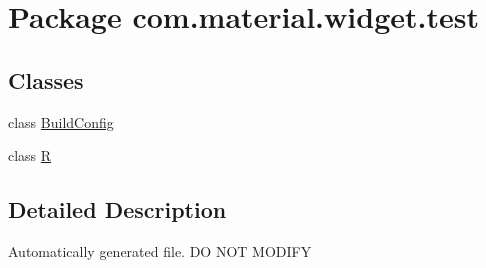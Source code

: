 \hypertarget{namespacecom_1_1material_1_1widget_1_1test}{}\section{Package com.\+material.\+widget.\+test}
\label{namespacecom_1_1material_1_1widget_1_1test}
\subsection*{Classes}
\begin{DoxyCompactItemize}
\item 
class \hyperlink{classcom_1_1material_1_1widget_1_1test_1_1_build_config}{Build\+Config}
\item 
class \hyperlink{classcom_1_1material_1_1widget_1_1test_1_1_r}{R}
\end{DoxyCompactItemize}


\subsection{Detailed Description}
Automatically generated file. DO N\+OT M\+O\+D\+I\+FY 